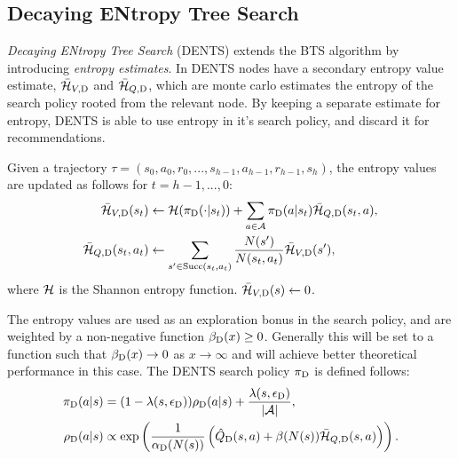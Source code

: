     
    \subsection{Decaying ENtropy Tree Search}
    \label{sec:4-2-2-dents}


        \textit{Decaying ENtropy Tree Search} (DENTS) extends the BTS algorithm by introducing \textit{entropy estimates}. In DENTS nodes have a secondary entropy value estimate, ${\bar{\mathcal{H}}_{V,{\textnormal{D}}}}$ and ${\bar{\mathcal{H}}_{Q,{\textnormal{D}}}}$, which are monte carlo estimates the entropy of the search policy rooted from the relevant node. By keeping a separate estimate for entropy, DENTS is able to use entropy in it's search policy, and discard it for recommendations.

        Given a trajectory $\tau=(s_0,a_0,r_0,...,s_{h-1},a_{h-1},r_{h-1},s_h)$, the entropy values are updated as follows for $t=h-1,...,0$:
        \begin{align}
            {\bar{\mathcal{H}}_{V,{\textnormal{D}}}}(s_t) &\leftarrow \mathcal{H}({\pi_{{\textnormal{D}}}}(\cdot | s_t)) + \sum_{a\in\mathcal{A}} {\pi_{{\textnormal{D}}}}(a|s_t){\bar{\mathcal{H}}_{Q,{\textnormal{D}}}}(s_t,a), 
            \label{eq:4:dents_entropy_v_backup} \\
            {\bar{\mathcal{H}}_{Q,{\textnormal{D}}}}(s_t,a_t) &\leftarrow \sum_{s'\in {\textnormal{Succ}(s_t,a_t)}} \frac{N(s')}{N(s_t,a_t)} {\bar{\mathcal{H}}_{V,{\textnormal{D}}}}(s'), 
            \label{eq::4dents_entropy_q_backup}
        \end{align}
        where $\mathcal{H}$ is the Shannon entropy function.  ${\bar{\mathcal{H}}_{V,{\textnormal{D}}}}(s) \leftarrow 0$.

        The entropy values are used as an exploration bonus in the search policy, and are weighted by a non-negative function ${\beta_{{\textnormal{D}}}}(x)\geq 0$. Generally this will be set to a function such that ${\beta_{{\textnormal{D}}}}(x)\rightarrow 0$ as $x\rightarrow\infty$ and will achieve better theoretical performance in this case. The DENTS search policy ${\pi_{{\textnormal{D}}}}$ is defined follows:
        \begin{align}
            {\pi_{{\textnormal{D}}}}(a|s) &= (1-{\lambda(s,{\epsilon_{{\textnormal{D}}}})}){\rho_{{\textnormal{D}}}}(a|s) + \frac{{\lambda(s,{\epsilon_{{\textnormal{D}}}})}}{|\mathcal{A}|}, 
                        \label{eq:dents_search_policy} \\ 
            {\rho_{{\textnormal{D}}}}(a|s) &\propto \exp\left(\frac{1}{{\alpha_{{\textnormal{D}}}}(N(s))}\left({\hat{Q}_{{\textnormal{D}}}}(s,a)+\beta(N(s)){\bar{\mathcal{H}}_{Q,{\textnormal{D}}}}(s,a)\right)\right).
                        \label{eq:dents_value_policy}
        \end{align}

